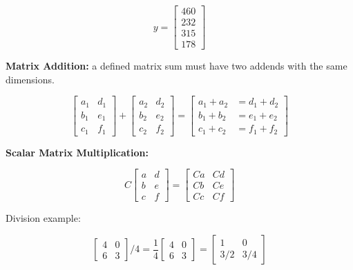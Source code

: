 \begin{equation*}
    y = \begin{bmatrix}
            460 \\
            232 \\
            315 \\
            178
    \end{bmatrix}
\end{equation*}

\noindent \textbf{Matrix Addition:} a defined matrix sum must have two addends with the same dimensions.

\begin{equation*}
    \begin{bmatrix}
        a_1 & d_1 \\
        b_1 & e_1 \\
        c_1 & f_1
    \end{bmatrix}
    +
    \begin{bmatrix}
        a_2 & d_2 \\
        b_2 & e_2 \\
        c_2 & f_2
    \end{bmatrix}
    =
    \begin{bmatrix}
        a_1 + a_2   &= d_1 + d_2 \\
        b_1 + b_2   &= e_1 + e_2 \\
        c_1 + c_2   &= f_1 + f_2
    \end{bmatrix}
\end{equation*}

\noindent \textbf{Scalar Matrix Multiplication:}

\begin{equation*}
    C   \begin{bmatrix}
            a & d \\
            b & e \\
            c & f
    \end{bmatrix}
    =
    \begin{bmatrix}
        Ca & Cd \\
        Cb & Ce \\
        Cc & Cf
    \end{bmatrix}
\end{equation*}

\noindent Division example:

\begin{equation*}
    \begin{bmatrix}
        4 & 0 \\
        6 & 3
    \end{bmatrix}
    /4
    =
    \frac{1}{4}
    \begin{bmatrix}
        4 & 0 \\
        6 & 3
    \end{bmatrix}
    =
    \begin{bmatrix}
        1   & 0 \\
        3/2 & 3/4
    \end{bmatrix}
\end{equation*}

